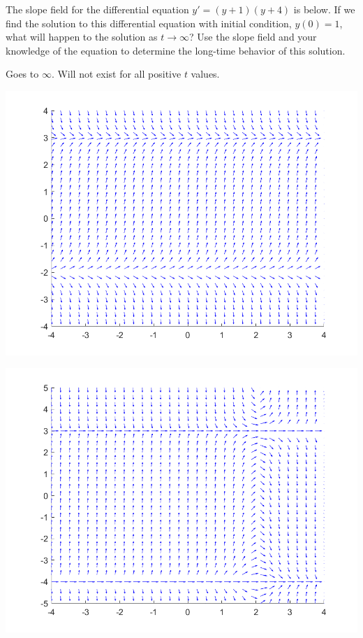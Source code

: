 \begin{exercise}\label{ex:yp1yp4}
The slope field for the differential equation $y' = (y+1)(y+4)$ is below. 
If we find the solution to this differential equation with initial condition, $y(0) = 1$, what will happen to the solution as $t \rightarrow \infty$? Use the slope field and your knowledge of the equation to determine the long-time behavior of this solution.
\end{exercise}
\comboSol{%
}
{%
Goes to $\infty$. Will not exist for all positive $t$ values.
}

\begin{minipage}{0.32\textwidth}
\includegraphics[width=\textwidth]{Images/yprime3myyp2slope}
\end{minipage}%
\begin{minipage}{0.32\textwidth}
\includegraphics[width=\textwidth]{Images/yprimetm2yp4ym3slope}
\end{minipage}%
